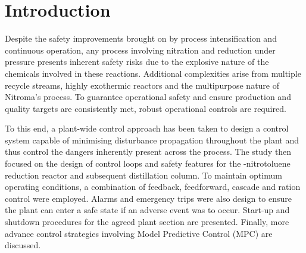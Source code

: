 \section{Introduction}%

Despite the safety improvements brought on by process intensification and continuous operation, any process involving nitration and reduction under pressure presents inherent safety risks due to the explosive nature of the chemicals involved in these reactions. Additional complexities arise from multiple recycle streams, highly exothermic reactors and the multipurpose nature of Nitroma's process. To guarantee operational safety and ensure production and quality targets are consistently met, robust operational controls are required.  

To this end, a plant-wide control approach has been taken to design a control system capable of minimising disturbance propagation throughout the plant and thus control the dangers inherently present across the process. The study then focused on the design of control loops and safety features for the \ortho-nitrotoluene reduction reactor and subsequent distillation column. To maintain optimum operating conditions, a combination of feedback, feedforward, cascade and ration control were employed. Alarms and emergency trips were also design to ensure the plant can enter a safe state if an adverse event was to occur. Start-up and shutdown procedures for the agreed plant section are presented. Finally, more advance control strategies involving Model Predictive Control (MPC) are discussed.


